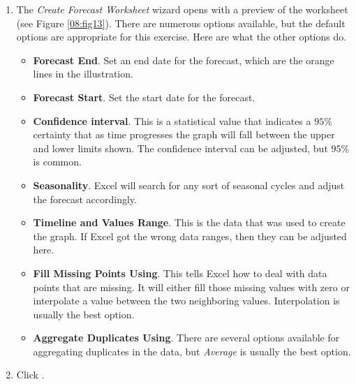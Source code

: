 \begin{enumerate}[resume]
	
	\item The \textit{Create Forecast Worksheet} wizard opens with a preview of the worksheet (see Figure \ref{08:fig13}). There are numerous options available, but the default options are appropriate for this exercise. Here are what the other options do.
	
	\begin{itemize}
		\item \textbf{Forecast End}. Set an end date for the forecast, which are the orange lines in the illustration.
		\item \textbf{Forecast Start}. Set the start date for the forecast.
		\item \textbf{Confidence interval}. This is a statistical value that indicates a $ 95 $\% certainty that as time progresses the graph will fall between the upper and lower limits shown. The confidence interval can be adjusted, but $ 95 $\% is common.
		\item \textbf{Seasonality}. Excel will search for any sort of seasonal cycles and adjust the forecast accordingly.
		\item \textbf{Timeline and Values Range}. This is the data that was used to create the graph. If Excel got the wrong data ranges, then they can be adjusted here.
		\item \textbf{Fill Missing Points Using}. This tells Excel how to deal with data points that are missing. It will either fill those missing values with zero or interpolate a value between the two neighboring values. Interpolation is usually the best option.
		\item \textbf{Aggregate Duplicates Using}. There are several options available for aggregating duplicates in the data, but \textit{Average} is usually the best option.
	\end{itemize}	
	
	\item Click .

\end{enumerate}

